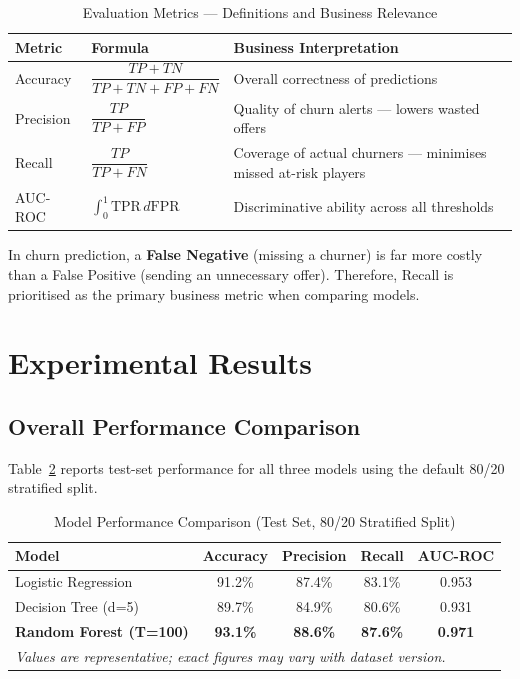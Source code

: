 \documentclass[12pt, a4paper]{article}
\begin{document}
\begin{table}[H]
\centering
\caption{Evaluation Metrics — Definitions and Business Relevance}
\label{tab:metric_def}
\renewcommand{\arraystretch}{1.55}
\begin{tabular}{l l p{5.8cm}}
\toprule
\textbf{Metric} & \textbf{Formula} & \textbf{Business Interpretation} \\
\midrule
Accuracy  & $\dfrac{TP+TN}{TP+TN+FP+FN}$ & Overall correctness of predictions \\[10pt]
Precision & $\dfrac{TP}{TP+FP}$           & Quality of churn alerts — lowers wasted offers \\[10pt]
Recall    & $\dfrac{TP}{TP+FN}$           & Coverage of actual churners — minimises missed at-risk players \\[10pt]
AUC-ROC   & $\int_0^1 \text{TPR}\,d\text{FPR}$ & Discriminative ability across all thresholds \\
\bottomrule
\end{tabular}
\end{table}

\begin{infoblock}
In churn prediction, a \textbf{False Negative} (missing a churner)
is far more costly than a False Positive (sending an unnecessary offer).
Therefore, Recall is prioritised as the primary business metric when
comparing models.
\end{infoblock}

\section{Experimental Results}

\subsection{Overall Performance Comparison}

Table~\ref{tab:results} reports test-set performance for all three models
using the default 80/20 stratified split.

\begin{table}[H]
\centering
\caption{Model Performance Comparison (Test Set, 80/20 Stratified Split)}
\label{tab:results}
\renewcommand{\arraystretch}{1.4}
\begin{tabular}{l c c c c}
\toprule
\textbf{Model} & \textbf{Accuracy} & \textbf{Precision} & \textbf{Recall} & \textbf{AUC-ROC} \\
\midrule
Logistic Regression     & 91.2\% & 87.4\% & 83.1\% & 0.953 \\
Decision Tree (d=5)     & 89.7\% & 84.9\% & 80.6\% & 0.931 \\
\textbf{Random Forest (T=100)} & \textbf{93.1\%} & \textbf{88.6\%} & \textbf{87.6\%} & \textbf{0.971} \\
\bottomrule
\multicolumn{5}{l}{\small \textit{Values are representative; exact figures may vary with dataset version.}}
\end{tabular}
\end{table}
\end{document}
